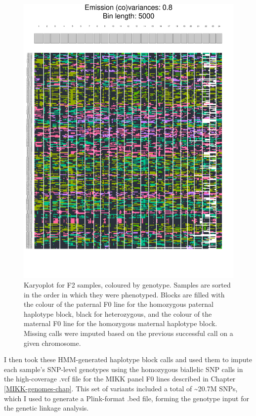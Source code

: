 \documentclass[
]{book}
\begin{document}
\begin{figure}
\includegraphics[width=1\linewidth]{figs/mikk_behaviour/karyoplot_no_missing} \caption{Karyoplot for F2 samples, coloured by genotype. Samples are sorted in the order in which they were phenotyped. Blocks are filled with the colour of the paternal F0 line for the homozygous paternal haplotype block, black for heterozygous, and the colour of the maternal F0 line for the homozygous maternal haplotype block. Missing calls were imputed based on the previous successful call on a given chromosome.}\label{fig:F2-recomb-blocks}
\end{figure}

I then took these HMM-generated haplotype block calls and used them to impute each sample's SNP-level genotypes using the homozygous biallelic SNP calls in the high-coverage .vcf file for the MIKK panel F0 lines described in Chapter \ref{MIKK-genomes-chap}. This set of variants included a total of \textasciitilde20.7M SNPs, which I used to generate a Plink-format .bed file, forming the genotype input for the genetic linkage analysis.
\end{document}
